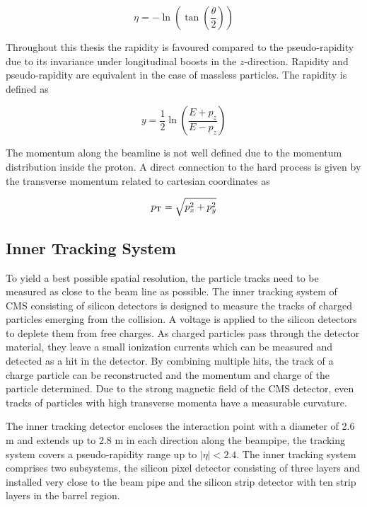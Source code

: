 \begin{equation*}
    \eta = - \ln \left( \tan \left( \frac{\theta}{2} \right) \right)
\end{equation*}

Throughout this thesis the rapidity is favoured compared to the pseudo-rapidity
due to its invariance under longitudinal boosts in the $z$-direction. Rapidity
and pseudo-rapidity are equivalent in the case of massless particles. The
rapidity is defined as

\begin{equation*}
    y = \frac{1}{2} \ln \left( \frac{E + p_z}{E - p_z} \right) 
\end{equation*}

The momentum along the beamline is not well defined due to the momentum
distribution inside the proton. A direct connection to the hard process is given
by the transverse momentum \pt related to cartesian coordinates as

\begin{equation*}
    p_{\mathrm{T}} = \sqrt{p_x^2 + p_y^2}
\end{equation*}

\subsection{Inner Tracking System}

To yield a best possible spatial resolution, the particle tracks need to be
measured as close to the beam line as possible. The inner tracking system of CMS
consisting of silicon detectors is designed to measure the tracks of charged
particles emerging from the collision. A voltage is applied to the silicon
detectors to deplete them from free charges. As charged particles pass through
the detector material, they leave a small ionization currents which can be
measured and detected as a hit in the detector. By combining multiple hits, the
track of a charge particle can be reconstructed and the momentum and charge of
the particle determined. Due to the strong magnetic field of the CMS detector,
even tracks of particles with high transverse momenta have a measurable
curvature.
 
The inner tracking detector encloses the interaction point with a diameter of 2.6 m and
extends up to 2.8 m in each direction along the beampipe, the tracking system covers a
pseudo-rapidity range up to $|\eta| < 2.4$. The inner tracking system comprises
two subsystems, the silicon pixel detector consisting of three layers and
installed very close to the beam pipe and the silicon strip detector with ten
strip layers in the barrel region. 

